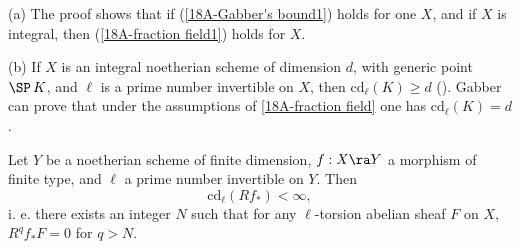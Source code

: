 \documentclass[10pt]{../fichiers-configuration-latex/smfart}
\begin{document}
\begin{remark}\label{18A-fraction field
sharp} (a) The proof shows that if (\ref{18A-Gabber's bound1}) holds for one $X$, and if $X$ is
integral, then (\ref{18A-fraction field1}) holds for $X$.
 
 (b) If $X$ is an integral noetherian scheme of dimension $d$, with generic point $\SP \, K$, and
$\ell$ is a prime number invertible on $X$, then $\mathrm{cd}_{\ell}(K) \ge d$ ().
Gabber can prove that under the assumptions of \ref{18A-fraction field} one has
$\mathrm{cd}_{\ell}(K) = d$.
\end{remark}

\begin{corollary}\label{18A-cd(f)} Let $Y$ be a
noetherian scheme of finite dimension, $f : X \ra Y$ a morphism of finite type, and $\ell$ a prime
number invertible on $Y$. Then $$ \mathrm{cd}_{\ell}(Rf_*) < \infty, $$ i. e. there exists an
integer $N$ such that for any $\ell$-torsion abelian sheaf $F$ on $X$, $R^qf_*F = 0$ for $q > N$.
\end{corollary}
\end{document}
